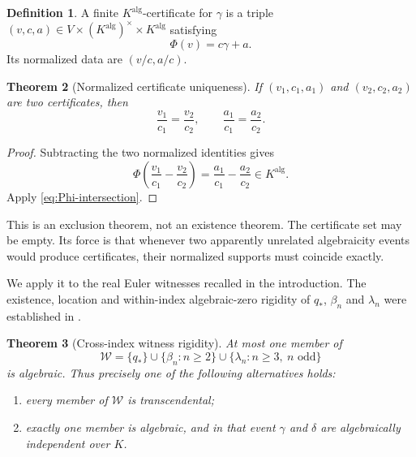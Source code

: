 \documentclass[11pt]{article}
\newtheorem{theorem}{Theorem}[section]
\theoremstyle{definition}
\newtheorem{definition}[theorem]{Definition}
\theoremstyle{remark}
\begin{document}
\begin{definition}
A finite \(K^{\mathrm{alg}}\)-certificate for \(\gamma\) is a triple
\((v,c,a)\in V\times(K^{\mathrm{alg}})^\times\times K^{\mathrm{alg}}\)
satisfying
\begin{equation}\label{eq:certificate}
 \Phi(v)=c\gamma+a.
\end{equation}
Its normalized data are \((v/c,a/c)\).
\end{definition}

\begin{theorem}[Normalized certificate uniqueness]
\label{thm:certificate-uniqueness}
If \((v_1,c_1,a_1)\) and \((v_2,c_2,a_2)\) are two certificates, then
\begin{equation}\label{eq:normalized-certificate-unique}
 \boxed{\displaystyle
 \frac{v_1}{c_1}=\frac{v_2}{c_2},\qquad
 \frac{a_1}{c_1}=\frac{a_2}{c_2}.}
\end{equation}
\end{theorem}

\begin{proof}
Subtracting the two normalized identities gives
\[
 \Phi\!\left(\frac{v_1}{c_1}-\frac{v_2}{c_2}\right)
 =\frac{a_1}{c_1}-\frac{a_2}{c_2}\in K^{\mathrm{alg}}.
\]
Apply \eqref{eq:Phi-intersection}.
\end{proof}

This is an exclusion theorem, not an existence theorem.  The certificate
set may be empty.  Its force is that whenever two apparently unrelated
algebraicity events would produce certificates, their normalized supports
must coincide exactly.

We apply it to the real Euler witnesses recalled in the introduction.  The
existence, location and within-index algebraic-zero rigidity of \(q_*\),
\(\beta_n\) and \(\lambda_n\) were established in
\cite[Thm.~14.2, Prop.~14.3, and Thm.~14.4]{KEIO2026I}.

\begin{theorem}[Cross-index witness rigidity]
\label{thm:cross-index}
At most one member of
\begin{equation}\label{eq:witness-set}
 \mathcal W=
 \{q_*\}\cup\{\beta_n:n\ge2\}
 \cup\{\lambda_n:n\ge3,\ n\text{ odd}\}
\end{equation}
is algebraic.  Thus precisely one of the following alternatives holds:
\begin{enumerate}[label=\textup{(\roman*)}]
 \item every member of \(\mathcal W\) is transcendental;
 \item exactly one member is algebraic, and in that event \(\gamma\) and
 \(\delta\) are algebraically independent over \(K\).
\end{enumerate}
\end{theorem}
\end{document}
